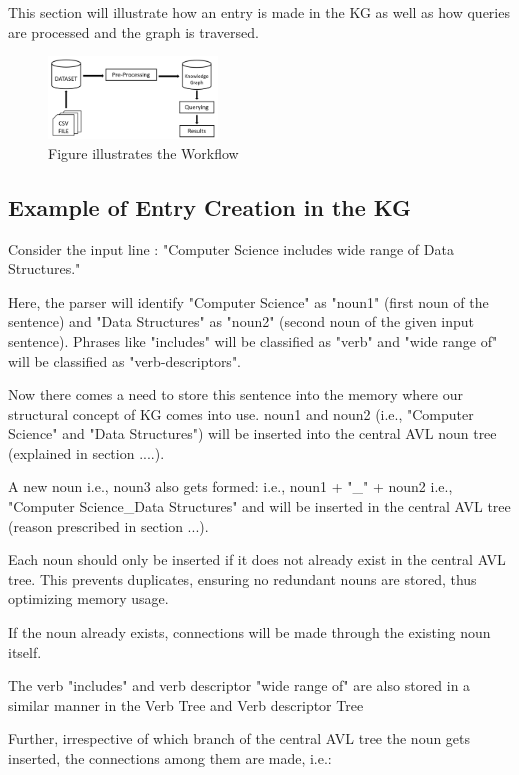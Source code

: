 \documentclass[conference]{IEEEtran}
\begin{document}
This section will illustrate how an entry is made in the KG as well as how queries are processed and the graph is traversed.

\begin{figure}[htbp]
\centerline{\includegraphics[width=0.4\textwidth]{workflow_diagram.png}}
\caption{Figure illustrates the Workflow}
\label{fig}
\end{figure}
\subsection{\textbf{Example of Entry Creation in the KG}}

Consider the input line : "Computer Science includes wide range of
Data Structures."

Here, the parser will identify "Computer Science" as "noun1" (first noun of the sentence)
and "Data Structures" as "noun2" (second noun of the given input sentence).
Phrases like "includes" will be classified as "verb" and "wide range of" will be classified as "verb-descriptors".

Now there comes a need to store this sentence into the memory where our structural concept
of KG comes into use.
noun1 and noun2 (i.e., "Computer Science" and "Data Structures") will be inserted into the central AVL noun
tree (explained in section ....).

A new noun i.e., noun3 also gets formed: i.e., noun1 + "\_" + noun2 i.e., "Computer Science\_Data Structures"
and will be inserted in the central AVL tree (reason prescribed in section ...).

Each noun should only be inserted if it does not already exist in the central AVL tree. 
This prevents duplicates, ensuring no redundant nouns are stored, thus optimizing memory usage.

If the noun already exists, connections will be made through the existing noun itself.

The verb "includes" and verb descriptor "wide range of" are also stored in a similar manner
in the Verb Tree and Verb descriptor Tree

Further, irrespective of which branch of the central AVL tree the noun gets inserted, 
the connections among them are made, i.e.:
\end{document}

